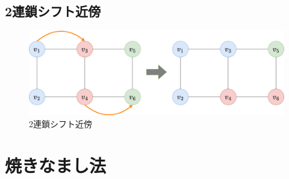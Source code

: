 \subsection{2連鎖シフト近傍}



\begin{figure}[htbp]
  \centering
  \includegraphics[scale=0.2]{img/chain-neighbor.png}
  \caption{2連鎖シフト近傍}
  \label{chain-neighbor}
\end{figure}

\section{焼きなまし法}

